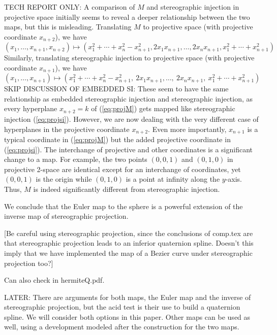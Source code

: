 \documentclass[12pt]{article}
\begin{document}
{TECH REPORT ONLY: 
A comparison of $M$ and stereographic injection in projective space initially 
seems to reveal a deeper relationship between the two maps,
but this is misleading.
Translating $M$ to projective space (with projective coordinate $x_{n+2}$), 
we have
\begin{equation}
\label{eq:projM}
(x_1,\ldots,x_{n+1},x_{n+2}) \mapsto 
	(x_1^2 + \cdots + x_{n}^2 - x_{n+1}^2,
	 2x_1x_{n+1}, \ldots, 2x_nx_{n+1}, x_1^2 + \cdots + x_{n+1}^2)
\end{equation}
Similarly, translating stereographic injection to projective space 
(with projective coordinate $x_{n+1}$), we have
\begin{equation}
\label{eq:projsi}
	(x_1,\ldots,x_{n+1}) \mapsto
	(x_1^2 + \cdots + x_n^2 - x_{n+1}^2,\ 2x_{1}x_{n+1}, \ldots,\ 2x_{n}x_{n+1},\ 
	x_1^2 + \cdots + x_{n+1}^2)
\end{equation}
SKIP DISCUSSION OF EMBEDDED SI:
These seem to have the same relationship as embedded stereographic
injection and stereographic injection,
as every hyperplane $x_{n+2}=k$ of (\ref{eq:projM}) gets mapped 
like stereographic injection (\ref{eq:projsi}).
However, we are now dealing with the very different case of 
hyperplanes in the projective coordinate $x_{n+2}$.
Even more importantly, $x_{n+1}$ is a typical %
coordinate in (\ref{eq:projM}) but the added projective coordinate in (\ref{eq:projsi}).
The interchange of projective and other coordinates is a significant
change to a map. %
For example, the two points $(0,0,1)$ and $(0,1,0)$ in projective 2-space
are identical except for an interchange of coordinates,
yet $(0,0,1)$ is the origin while $(0,1,0)$ is a point at infinity
along the $y$-axis.
Thus, $M$ is indeed significantly different from stereographic injection.

We conclude that the Euler map to the sphere is a powerful extension of
the inverse map of stereographic projection.

[Be careful using stereographic projection, since the conclusions of comp.tex are that
stereographic projection leads to an inferior quaternion spline.
Doesn't this imply that we have implemented the map of a Bezier curve under
stereographic projection too?]

Can also check in hermiteQ.pdf.

LATER:
There are arguments for both maps, the Euler map and the inverse of stereographic
projection, but the acid test is their use to build a quaternion spline.
We will consider both options in this paper.
Other maps can be used as well, using a development modeled after the construction
for the two maps.

}
\end{document}
